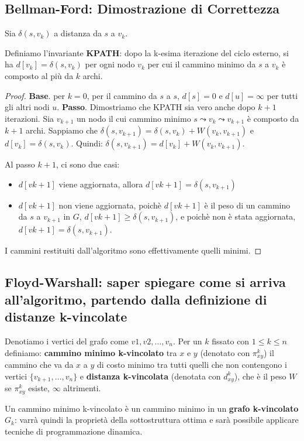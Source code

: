 \documentclass[11pt]{article}
\begin{document}
\subsection*{Bellman-Ford: Dimostrazione di Correttezza}
Sia $\delta(s,v_k)$ a distanza da $s$ a $v_k$.

Definiamo l'invariante \textbf{KPATH}: dopo la k-esima iterazione del ciclo esterno, si ha $d[v_k]=\delta(s,v_k)$ per ogni 
nodo $v_k$ per cui il cammino minimo da $s$ a $v_k$ è composto al più da $k$ archi.
\begin{proof}
    \textbf{Base}. per $k=0$, per il cammino da $s$ a $s$, $d[s]=0$ e $d[u]=\infty$ per tutti gli altri nodi $u$. 
    \textbf{Passo}. Dimostriamo che KPATH sia vero anche dopo $k+1$ iterazioni. Sia $v_{k+1}$ un nodo il cui cammino minimo 
    $s\leadsto v_k\leadsto v_{k+1}$ è composto da $k+1$ archi. Sappiamo che $\delta(s,v_{k+1})=\delta(s,v_k)+W(v_k,v_{k+1})$
    e $d[v_k]=\delta(s,v_k)$. Quindi: $\delta(s,v_{k+1})=d[v_k]+W(v_k,v_{k+1})$.

    Al passo $k+1$, ci sono due casi:
    \begin{itemize}
        \item $d[v{k+1}]$ viene aggiornata, allora $d[v{k+1}]=\delta(s,v_{k+1})$
        \item $d[v{k+1}]$ non viene aggiornata, poichè $d[v{k+1}]$ è il peso di un cammino da $s$ a $v_{k+1}$ in $G$, 
        $d[v{k+1}]\geq \delta(s,v_{k+1})$, e poichè non è stata aggiornata, $d[v{k+1}]=\delta(s,v_{k+1})$.
    \end{itemize}
    I cammini restituiti dall'algoritmo sono effettivamente quelli minimi.
\end{proof}
\subsection*{Floyd-Warshall: saper spiegare come si arriva all'algoritmo, partendo dalla definizione di distanze k-vincolate}
Denotiamo i vertici del grafo come $v1,v2,\dots,v_n$. Per un $k$ fissato con $1\leq k\leq n$ definiamo: \textbf{cammino 
minimo k-vincolato} tra $x$ e $y$ (denotato con $\pi^k_{xy}$) il cammino che va da $x$ a $y$ di costo minimo tra tutti
quelli che non contengono i vertici $\{v_{k+1},\dots,v_n\}$ e \textbf{distanza k-vincolata} (denotata con $d^k_{xy}$), 
che è il peso $W$ se $\pi^k_{xy}$ esiste, $\infty$ altrimenti.

Un cammino minimo k-vincolato è un cammino minimo in un \textbf{grafo k-vincolato} $G_k$: varrà quindi la proprietà della 
sottostruttura ottima e sarà possibile applicare tecniche di programmazione dinamica. 
\end{document}
